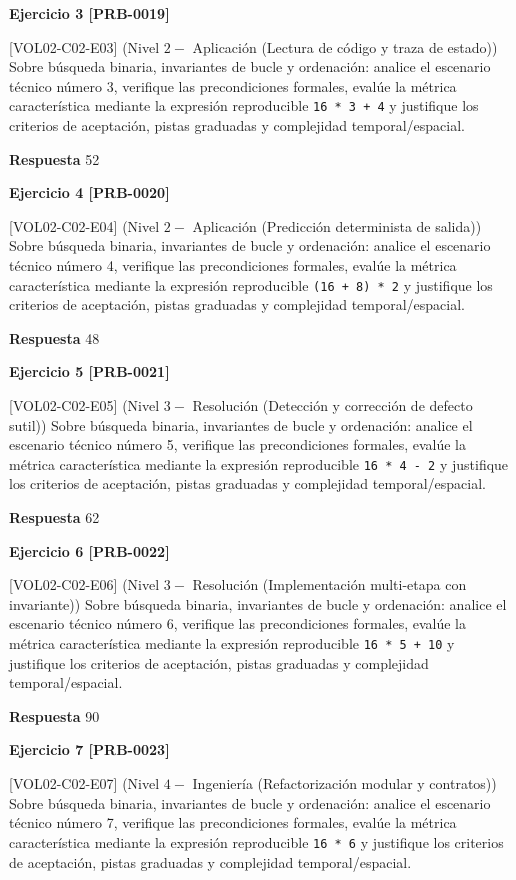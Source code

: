 \documentclass{book}
\begin{document}
\noindent\textbf{Ejercicio 3 [PRB-0019]}

[VOL02-C02-E03] (Nivel \(2 -\) Aplicación (Lectura de código y traza de estado)) Sobre búsqueda binaria, invariantes de bucle y ordenación: analice el escenario técnico número 3, verifique las precondiciones formales, evalúe la métrica característica mediante la expresión reproducible \texttt{16 * 3 + 4} y justifique los criterios de aceptación, pistas graduadas y complejidad temporal/espacial.

\noindent\textbf{Respuesta} 52

\noindent\textbf{Ejercicio 4 [PRB-0020]}

[VOL02-C02-E04] (Nivel \(2 -\) Aplicación (Predicción determinista de salida)) Sobre búsqueda binaria, invariantes de bucle y ordenación: analice el escenario técnico número 4, verifique las precondiciones formales, evalúe la métrica característica mediante la expresión reproducible \texttt{(16 + 8) * 2} y justifique los criterios de aceptación, pistas graduadas y complejidad temporal/espacial.

\noindent\textbf{Respuesta} 48

\noindent\textbf{Ejercicio 5 [PRB-0021]}

[VOL02-C02-E05] (Nivel \(3 -\) Resolución (Detección y corrección de defecto sutil)) Sobre búsqueda binaria, invariantes de bucle y ordenación: analice el escenario técnico número 5, verifique las precondiciones formales, evalúe la métrica característica mediante la expresión reproducible \texttt{16 * 4 - 2} y justifique los criterios de aceptación, pistas graduadas y complejidad temporal/espacial.

\noindent\textbf{Respuesta} 62

\noindent\textbf{Ejercicio 6 [PRB-0022]}

[VOL02-C02-E06] (Nivel \(3 -\) Resolución (Implementación multi-etapa con invariante)) Sobre búsqueda binaria, invariantes de bucle y ordenación: analice el escenario técnico número 6, verifique las precondiciones formales, evalúe la métrica característica mediante la expresión reproducible \texttt{16 * 5 + 10} y justifique los criterios de aceptación, pistas graduadas y complejidad temporal/espacial.

\noindent\textbf{Respuesta} 90

\noindent\textbf{Ejercicio 7 [PRB-0023]}

[VOL02-C02-E07] (Nivel \(4 -\) Ingeniería (Refactorización modular y contratos)) Sobre búsqueda binaria, invariantes de bucle y ordenación: analice el escenario técnico número 7, verifique las precondiciones formales, evalúe la métrica característica mediante la expresión reproducible \texttt{16 * 6} y justifique los criterios de aceptación, pistas graduadas y complejidad temporal/espacial.
\end{document}
